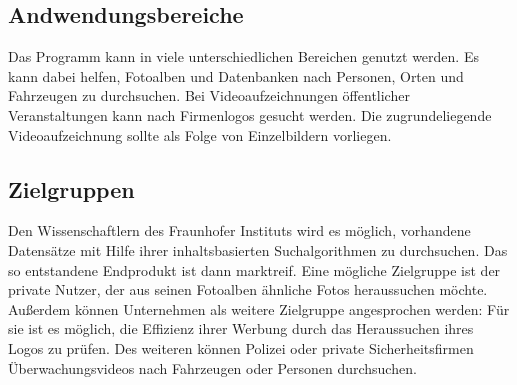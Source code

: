 \subsection{Andwendungsbereiche}

Das Programm kann in viele unterschiedlichen Bereichen genutzt werden. Es kann dabei helfen, Fotoalben und Datenbanken nach Personen, Orten und Fahrzeugen zu durchsuchen. Bei Videoaufzeichnungen öffentlicher Veranstaltungen kann nach Firmenlogos gesucht werden. Die zugrundeliegende Videoaufzeichnung sollte als Folge von Einzelbildern vorliegen.

\subsection{Zielgruppen}

Den Wissenschaftlern des Fraunhofer Instituts wird es möglich, vorhandene Datensätze mit Hilfe ihrer inhaltsbasierten Suchalgorithmen zu durchsuchen. Das so entstandene Endprodukt ist dann marktreif.
Eine mögliche Zielgruppe ist der private Nutzer, der aus seinen Fotoalben ähnliche Fotos heraussuchen möchte. 
Außerdem können Unternehmen als weitere Zielgruppe angesprochen werden: Für sie ist es möglich, die Effizienz ihrer Werbung durch das Heraussuchen ihres Logos zu prüfen. 
Des weiteren können Polizei oder private Sicherheitsfirmen Überwachungsvideos nach Fahrzeugen oder Personen durchsuchen.